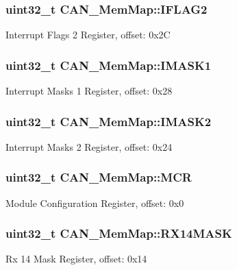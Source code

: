 \subsubsection[{I\+F\+L\+A\+G2}]{\setlength{\rightskip}{0pt plus 5cm}uint32\+\_\+t C\+A\+N\+\_\+\+Mem\+Map\+::\+I\+F\+L\+A\+G2}\label{struct_c_a_n___mem_map_aa06064731318366c51bc3ee552491070}
Interrupt Flags 2 Register, offset\+: 0x2\+C \hypertarget{struct_c_a_n___mem_map_ad847310f75c51368595da91e905ad1bf}{}
\subsubsection[{I\+M\+A\+S\+K1}]{\setlength{\rightskip}{0pt plus 5cm}uint32\+\_\+t C\+A\+N\+\_\+\+Mem\+Map\+::\+I\+M\+A\+S\+K1}\label{struct_c_a_n___mem_map_ad847310f75c51368595da91e905ad1bf}
Interrupt Masks 1 Register, offset\+: 0x28 \hypertarget{struct_c_a_n___mem_map_a7f5ec3c75c69675f968a5d42c86d73f6}{}
\subsubsection[{I\+M\+A\+S\+K2}]{\setlength{\rightskip}{0pt plus 5cm}uint32\+\_\+t C\+A\+N\+\_\+\+Mem\+Map\+::\+I\+M\+A\+S\+K2}\label{struct_c_a_n___mem_map_a7f5ec3c75c69675f968a5d42c86d73f6}
Interrupt Masks 2 Register, offset\+: 0x24 \hypertarget{struct_c_a_n___mem_map_aa78ee3ab61a8a0a9bceade6152bccec3}{}
\subsubsection[{M\+C\+R}]{\setlength{\rightskip}{0pt plus 5cm}uint32\+\_\+t C\+A\+N\+\_\+\+Mem\+Map\+::\+M\+C\+R}\label{struct_c_a_n___mem_map_aa78ee3ab61a8a0a9bceade6152bccec3}
Module Configuration Register, offset\+: 0x0 \hypertarget{struct_c_a_n___mem_map_ad9454220446b5a706a53b100d31c223a}{}
\subsubsection[{R\+X14\+M\+A\+S\+K}]{\setlength{\rightskip}{0pt plus 5cm}uint32\+\_\+t C\+A\+N\+\_\+\+Mem\+Map\+::\+R\+X14\+M\+A\+S\+K}\label{struct_c_a_n___mem_map_ad9454220446b5a706a53b100d31c223a}
Rx 14 Mask Register, offset\+: 0x14 \hypertarget{struct_c_a_n___mem_map_a4e60a1ec55f8fc14e4cdcd00e922d76d}{}
